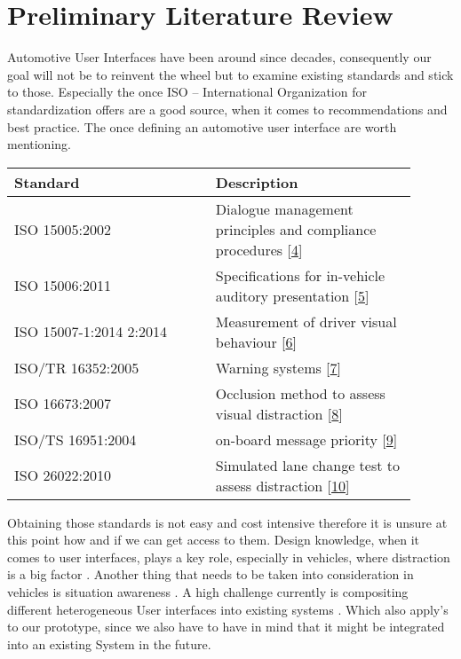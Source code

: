 \documentclass[hidelinks]{sig-alternate}
\begin{document}
\section{Preliminary Literature Review}
Automotive User Interfaces have been around since decades, consequently our goal will not be to reinvent the wheel but to examine existing standards and stick to those. Especially the once ISO – International Organization for standardization offers are a good source, when it comes to recommendations and best practice. The once defining an automotive user interface are worth mentioning. 

\noindent
\def\arraystretch{1.2}
\begin{tabular}{p{0.45\linewidth} | p{0.45\linewidth}}
Standard & Description \\\hline
ISO 15005:2002 & Dialogue management principles and compliance procedures [\href{http://www.iso.org/iso/home/store/catalogue_tc/catalogue_detail.htm?csnumber=34085}{4}]\\\hline
ISO 15006:2011 & Specifications for in-vehicle auditory presentation [\href{http://www.iso.org/iso/home/store/catalogue_tc/catalogue_detail.htm?csnumber=55322}{5}]\\\hline
ISO 15007-1:2014 2:2014 & Measurement of driver visual behaviour [\href{http://www.iso.org/iso/home/store/catalogue_tc/catalogue_detail.htm?csnumber=63220}{6}]\\\hline
ISO/TR 16352:2005 & Warning systems [\href{http://www.iso.org/iso/home/store/catalogue_tc/catalogue_detail.htm?csnumber=37859}{7}]\\\hline
ISO 16673:2007 & Occlusion method to assess visual distraction [\href{http://www.iso.org/iso/home/store/catalogue_tc/catalogue_detail.htm?csnumber=38035\#5}{8}]\\\hline
ISO/TS 16951:2004 & on-board message priority [\href{http://www.iso.org/iso/home/store/catalogue_tc/catalogue_detail.htm?csnumber=29024}{9}] \\\hline
ISO 26022:2010 & Simulated lane change test to assess distraction [\href{http://www.iso.org/iso/home/store/catalogue_tc/catalogue_detail.htm?csnumber=43361}{10}]
\end{tabular}
Obtaining those standards is not easy and cost intensive therefore it is unsure at this point how and if we can get access to them. Design knowledge, when it comes to  user interfaces, plays a key role, especially in vehicles, where distraction is a big factor  \cite{Developmentofanautomotiveuserinterfacedesignknowledgesystem}.
 Another thing that needs to be taken into consideration in vehicles is situation awareness \cite{Skrypchuk2016}. A high challenge currently is compositing different heterogeneous User interfaces into existing systems \cite{Holstein2015}. Which also apply's to our prototype, since we also have to have in mind that it might be integrated into an existing System in the future.




\end{document}
